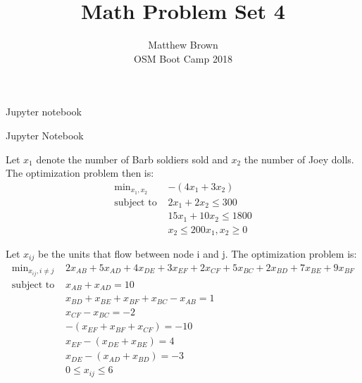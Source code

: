 \documentclass[12pt]{article}
\newenvironment{problem}[2][Problem]{\begin{trivlist}
\item[\hskip \labelsep {\bfseries #1}\hskip \labelsep {\bfseries #2.}]}{\end{trivlist}}
\theoremstyle{definition}
\theoremstyle{definition}
\theoremstyle{definition}
\theoremstyle{definition}
\begin{document}
\title{Math Problem Set 4}
\author{Matthew Brown\\ 
OSM Boot Camp 2018} %
 
\maketitle
 
\begin{problem}{8.1}
Jupyter notebook
\end{problem}

\begin{problem}{8.2}
Jupyter Notebook
\end{problem}

\begin{problem}{8.3}
Let $x_1$ denote the number of Barb soldiers sold and $x_2$ the number of Joey dolls. The optimization problem then is:
\begin{align*}
\text{min}_{x_1, x_2} & -(4 x_1 + 3 x_2) \\
\text{subject to }
& 2x_1 + 2 x_2 \leq 300 \\
& 15x_1 + 10x_2 \leq 1800 \\
& x_2 \leq 200
x_1, x_2 \geq 0
\end{align*}
\end{problem}

\begin{problem}{8.4}
Let $x_{ij}$ be the units that flow between node i and j. The optimization problem is:
\begin{align*}
\text{min}_{x_{ij}, i \neq j} & 2x_{AB} + 5x_{AD} +4 x_{DE} + 3 x_{EF} + 2 x_{CF} + 5x_{BC} + 2 x_{BD} + 7x_{BE} + 9 x_{BF} \\
\text{subject to }& x_{AB} + x_{AD} = 10\\
& x_{BD} + x_{BE} +x_{BF} + x_{BC} - x_{AB} = 1 \\
& x_{CF} - x_{BC} = -2 \\
& - (x_{EF} + x_{BF} + x_{CF}) = -10 \\
& x_{EF} - (x_{DE} + x_{BE}) = 4 \\
& x_{DE} - (x_{AD} + x_{BD}) = -3 \\
& 0 \leq x_{ij} \leq 6
\end{align*}
\end{problem}

\begin{problem}{8.5}
\end{problem}

\begin{problem}{8.6}
\end{problem}
\end{document}
